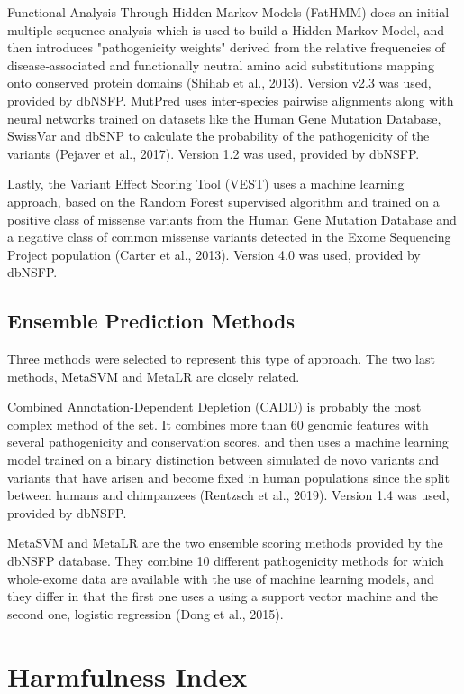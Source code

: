 \documentclass[12pt,MSc,wordcount,anon]{muthesis}
\begin{document}
\begin{flushleft}
Functional Analysis Through Hidden Markov Models (FatHMM) does an initial multiple sequence analysis which is used to build a Hidden Markov Model, and then introduces "pathogenicity weights" derived from the relative frequencies of disease‐associated and functionally neutral amino acid substitutions mapping onto conserved protein domains (Shihab et al., 2013). Version v2.3 was used, provided by dbNSFP.
MutPred uses inter-species pairwise alignments along with neural networks trained on datasets like the Human Gene Mutation Database, SwissVar and dbSNP to calculate the probability of the pathogenicity of the variants (Pejaver et al., 2017). Version 1.2 was used, provided by dbNSFP.

Lastly, the Variant Effect Scoring Tool (VEST) uses a machine learning approach, based on the Random Forest supervised algorithm and trained on a positive class of missense variants from the Human Gene Mutation Database and a negative class of common missense variants detected in the Exome Sequencing Project population (Carter et al., 2013). Version 4.0 was used, provided by dbNSFP.

\subsection{Ensemble Prediction Methods}

Three methods were selected to represent this type of approach. The two last methods, MetaSVM and MetaLR are closely related.

Combined Annotation-Dependent Depletion (CADD) is probably the most complex method of the set. It combines more than 60 genomic features with several pathogenicity and conservation scores, and then uses a machine learning model trained on a binary distinction between simulated de novo variants and variants that have arisen and become fixed in human populations since the split between humans and chimpanzees (Rentzsch et al., 2019). Version 1.4 was used, provided by dbNSFP.

MetaSVM and MetaLR are the two ensemble scoring methods provided by the dbNSFP database. They combine 10 different pathogenicity methods for which whole-exome data are available with the use of machine learning models, and they differ in that the first one uses a using a support vector machine and the second one, logistic regression (Dong et al., 2015).

\section{Harmfulness Index}


\end{flushleft}
\end{document}
